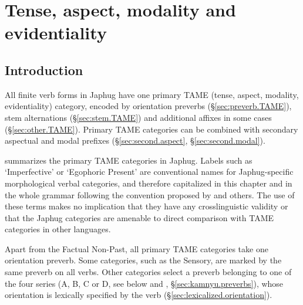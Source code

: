  \chapter{Tense, aspect, modality and evidentiality} \label{chap:tame}

\section{Introduction} \label{sec:tame.intro}
All finite verb forms in Japhug have one primary TAME (tense, aspect, modality, evidentiality) category, encoded by  orientation preverbs (§\ref{sec:preverb.TAME}), stem alternations (§\ref{sec:stem.TAME})  and additional affixes in some cases (§\ref{sec:other.TAME}). Primary TAME categories can be combined with secondary aspectual and modal prefixes (§\ref{sec:second.aspect}, §\ref{sec:second.modal}).

  summarizes the primary TAME categories in Japhug. Labels such as `Imperfective' or `Egophoric Present' are 
conventional names for Japhug-specific morphological verbal categories, and therefore capitalized in this chapter and in the whole 
grammar following the convention proposed by \citet[674]{haspelmath10categories} and others. The use of these terms makes no implication 
that they have any crosslinguistic validity or that the Japhug categories are amenable to direct comparison with TAME categories in 
other languages.

Apart from the Factual Non-Past, all primary TAME categories take one orientation preverb. Some categories, such as the Sensory, are marked by the same preverb on all verbs. Other categories select a preverb belonging to one of the four series (A, B, C or D, see  below and , §\ref{sec:kamnyu.preverbs}), whose orientation is lexically specified by the verb (§\ref{sec:lexicalized.orientation}).

